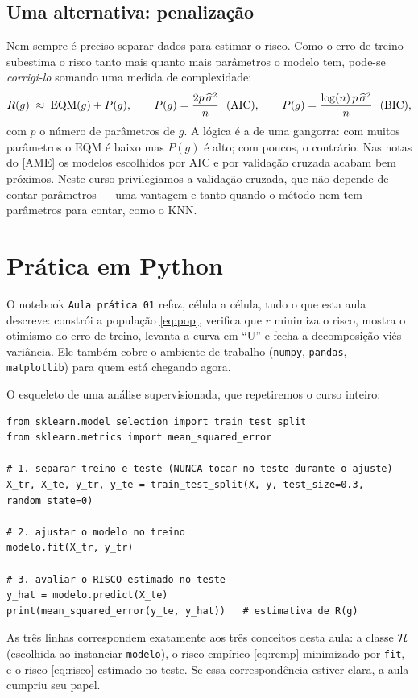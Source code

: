 \documentclass[11pt,a4paper]{article}
\begin{document}
\subsection*{Uma alternativa: penalização}
Nem sempre é preciso separar dados para estimar o risco. Como o erro de treino
subestima o risco tanto mais quanto mais parâmetros o modelo tem, pode-se
\emph{corrigi-lo} somando uma medida de complexidade:
\[
  R(g) \;\approx\; \mathrm{EQM}(g) + P(g),
  \qquad
  P(g)=\frac{2p\,\widehat\sigma^2}{n} \ \ (\text{AIC}),
  \qquad
  P(g)=\frac{\log(n)\,p\,\widehat\sigma^2}{n} \ \ (\text{BIC}),
\]
com $p$ o número de parâmetros de $g$. A lógica é a de uma gangorra: com muitos
parâmetros o $\mathrm{EQM}$ é baixo mas $P(g)$ é alto; com poucos, o contrário. Nas
notas do [AME] os modelos escolhidos por AIC e por validação cruzada acabam bem
próximos. Neste curso privilegiamos a validação cruzada, que não depende de contar
parâmetros --- uma vantagem e tanto quando o método nem tem parâmetros para contar,
como o KNN.

\section{Prática em Python}
O notebook \texttt{Aula prática 01} refaz, célula a célula, tudo o que esta aula
descreve: constrói a população \eqref{eq:pop}, verifica que $r$ minimiza o risco,
mostra o otimismo do erro de treino, levanta a curva em ``U'' e fecha a decomposição
viés--variância. Ele também cobre o ambiente de trabalho (\texttt{numpy},
\texttt{pandas}, \texttt{matplotlib}) para quem está chegando agora.

O esqueleto de uma análise supervisionada, que repetiremos o curso inteiro:
\begin{lstlisting}
from sklearn.model_selection import train_test_split
from sklearn.metrics import mean_squared_error

# 1. separar treino e teste (NUNCA tocar no teste durante o ajuste)
X_tr, X_te, y_tr, y_te = train_test_split(X, y, test_size=0.3, random_state=0)

# 2. ajustar o modelo no treino
modelo.fit(X_tr, y_tr)

# 3. avaliar o RISCO estimado no teste
y_hat = modelo.predict(X_te)
print(mean_squared_error(y_te, y_hat))   # estimativa de R(g)
\end{lstlisting}
As três linhas correspondem exatamente aos três conceitos desta aula: a classe
$\mathcal{H}$ (escolhida ao instanciar \texttt{modelo}), o risco empírico
\eqref{eq:remp} minimizado por \texttt{fit}, e o risco \eqref{eq:risco} estimado no
teste. Se essa correspondência estiver clara, a aula cumpriu seu papel.
\end{document}
